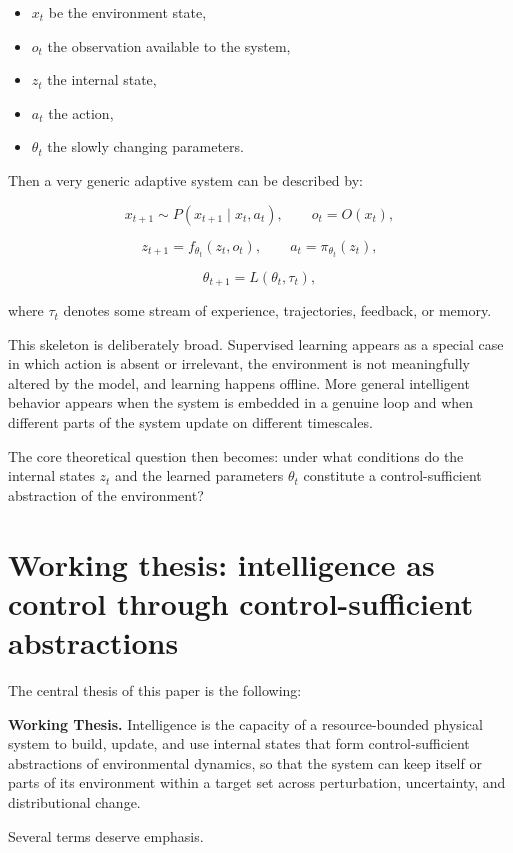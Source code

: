 \documentclass[11pt]{article}
\begin{document}
\begin{itemize}
\item \(x_t\) be the environment state,
\item \(o_t\) the observation available to the system,
\item \(z_t\) the internal state,
\item \(a_t\) the action,
\item \(\theta_t\) the slowly changing parameters.

\end{itemize}

Then a very generic adaptive system can be described by:

\[
x_{t+1} \sim P(x_{t+1}\mid x_t, a_t), \qquad
o_t = O(x_t),
\]

\[
z_{t+1} = f_{\theta_t}(z_t, o_t), \qquad
a_t = \pi_{\theta_t}(z_t),
\]

\[
\theta_{t+1} = L(\theta_t, \tau_t),
\]

where \(\tau_t\) denotes some stream of experience, trajectories, feedback, or memory.

This skeleton is deliberately broad. Supervised learning appears as a special case in which action is absent or irrelevant, the environment is not meaningfully altered by the model, and learning happens offline. More general intelligent behavior appears when the system is embedded in a genuine loop and when different parts of the system update on different timescales.

The core theoretical question then becomes: under what conditions do the internal states \(z_t\) and the learned parameters \(\theta_t\) constitute a control-sufficient abstraction of the environment?

\section{Working thesis: intelligence as control through control-sufficient abstractions}


The central thesis of this paper is the following:

\textbf{Working Thesis.} Intelligence is the capacity of a resource-bounded physical system to build, update, and use internal states that form control-sufficient abstractions of environmental dynamics, so that the system can keep itself or parts of its environment within a target set across perturbation, uncertainty, and distributional change.

Several terms deserve emphasis.
\end{document}
